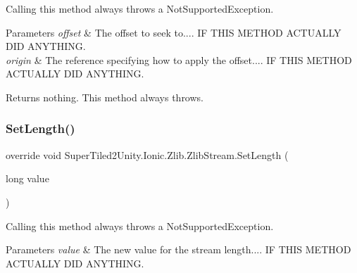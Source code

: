 Calling this method always throws a Not\+Supported\+Exception. 


\begin{DoxyParams}{Parameters}
{\em offset} & The offset to seek to.... IF T\+H\+IS M\+E\+T\+H\+OD A\+C\+T\+U\+A\+L\+LY D\+ID A\+N\+Y\+T\+H\+I\+NG. \\
\hline
{\em origin} & The reference specifying how to apply the offset.... IF T\+H\+IS M\+E\+T\+H\+OD A\+C\+T\+U\+A\+L\+LY D\+ID A\+N\+Y\+T\+H\+I\+NG. \\
\hline
\end{DoxyParams}


\begin{DoxyReturn}{Returns}
nothing. This method always throws.
\end{DoxyReturn}
\mbox{\label{class_super_tiled2_unity_1_1_ionic_1_1_zlib_1_1_zlib_stream_a13d9e75b41788d1592c2278b349b6645}} 
\subsubsection{\texorpdfstring{Set\+Length()}{SetLength()}}
{\footnotesize\ttfamily override void Super\+Tiled2\+Unity.\+Ionic.\+Zlib.\+Zlib\+Stream.\+Set\+Length (\begin{DoxyParamCaption}\item[{long}]{value }\end{DoxyParamCaption})}



Calling this method always throws a Not\+Supported\+Exception. 


\begin{DoxyParams}{Parameters}
{\em value} & The new value for the stream length.... IF T\+H\+IS M\+E\+T\+H\+OD A\+C\+T\+U\+A\+L\+LY D\+ID A\+N\+Y\+T\+H\+I\+NG. \\
\hline
\end{DoxyParams}
\mbox{\label{class_super_tiled2_unity_1_1_ionic_1_1_zlib_1_1_zlib_stream_a9e368cfa1fa92b4c484816848f5cfd6a}} 
